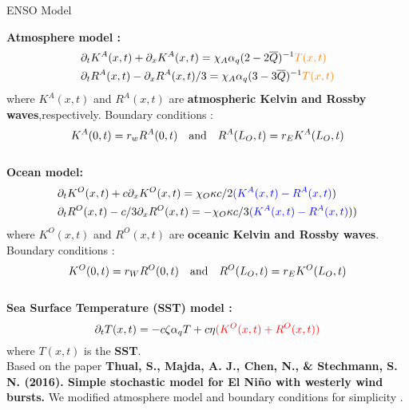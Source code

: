 \documentclass[9pt,xcolor=dvipsnames]{beamer}
\begin{document}
\begin{frame}{ENSO Model}

    {\footnotesize     \textbf{\color{blue} Atmosphere model :}
\begin{align*}\label{eq:atm_trun}
  &  \partial_{t} K^{A}(x,t) + \partial_{x} K^{A}(x,t) = \chi_{A}  \alpha_{q}  (2 -  2\overline{Q})^{-1} {\color{orange} T(x,t)} \\
  &  \partial_{t} R^{A}(x,t) -\partial_{x} R^{A}(x,t)/3 = \chi_{A} \alpha_{q}  (3 - 3 \overline{Q})^{-1}  {\color{orange}T(x,t)} 
\end{align*}
where $K^{A}(x,t)$ and $R^{A}(x,t)$ are \textbf{ atmospheric Kelvin and Rossby waves},respectively. Boundary conditions : 
\begin{equation*}
K^{A} (0,t) = r_w R^{A}(0,t) \hspace{0.35cm} \text{and} \hspace{0.35cm}  R^{A} (L_O,t) =r_E K^{A}(L_{O},t)  
\end{equation*} 
\vspace{0.5cm} \\
    \textbf{\color{red}Ocean model:}
    \begin{align*}\label{eq:ocean_trun}
    &    \partial_{t} K^{O}(x,t) + c \partial_{x} K^{O}(x,t)   = \chi_{O} \kappa c/2 {\color{blue}(K^{A}(x,t) - R^{A}(x,t)  })   \\
    &   \partial_{t} R^{O}(x,t) - c/3 \partial_{x} R^{O}(x,t)  = -\chi_{O} \kappa  c/3 {\color{blue}(K^{A}(x,t) - R^{A}(x,t)  }) ) 
    \end{align*}
 where $K^{O}(x,t)$ and $R^{O}(x,t)$ are \textbf{ oceanic Kelvin and Rossby waves}. Boundary conditions :  \\
 \begin{equation*}
    K^{O} (0,t) = r_{W}R^{O} (0,t) \hspace{0.35cm} \text{and} \hspace{0.35cm} R^{O} (L_{O},t) = r_{E} K^{O} (L_{O},t)
\end{equation*}
 \vspace{0.5cm} \\ 
\textbf{\color{orange} Sea Surface Temperature (SST) model :}
\begin{equation*}\label{eq:SST_trun}
    \partial_{t} T(x,t)  =   -c \zeta \alpha_{q} T + c \eta {\color{red}(K^{O}(x,t) + R^{O}(x,t))}
\end{equation*}
where $T(x,t)$ is the \textbf{SST}. } \\
{\footnotesize  Based on the paper  \textbf{Thual, S., Majda, A. J., Chen, N., \& Stechmann, S. N. (2016). Simple stochastic model for El Niño with westerly wind bursts.} We modified atmosphere model and boundary conditions for simplicity \cite{Chen2018}.  }
\end{frame}
\end{document}
